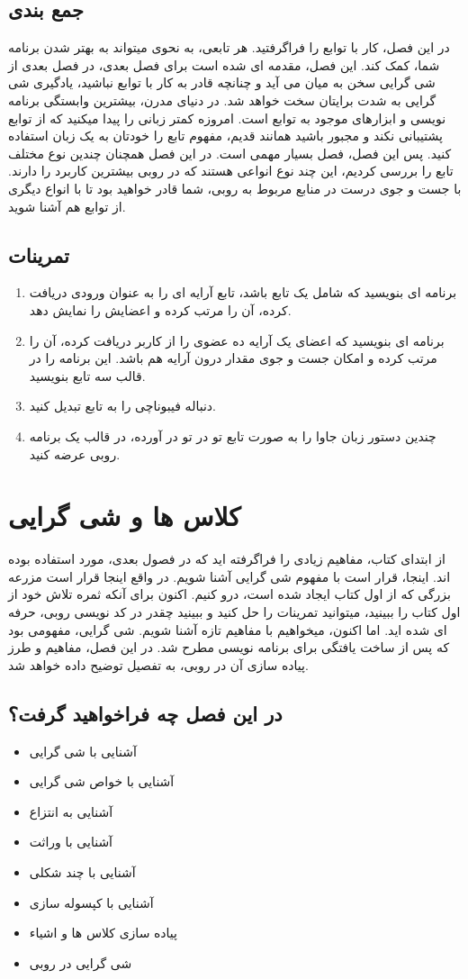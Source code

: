 \documentclass[11pt]{article}
\begin{document}
\subsection{جمع بندی}
در این فصل، کار با توابع را فراگرفتید. هر تابعی، به نحوی میتواند به بهتر شدن برنامه شما، کمک کند. این فصل، مقدمه ای شده است برای فصل بعدی، در فصل بعدی از شی گرایی سخن به میان می آید و چنانچه قادر به کار با توابع نباشید، یادگیری شی گرایی به شدت برایتان سخت خواهد شد. در دنیای مدرن، بیشترین وابستگی برنامه نویسی و ابزارهای موجود به توابع است. امروزه کمتر زبانی را پیدا میکنید که از توابع پشتیبانی نکند و مجبور باشید همانند قدیم، مفهوم تابع را خودتان به یک زبان استفاده کنید. پس این فصل، فصل بسیار مهمی است. در این فصل همچنان چندین نوع مختلف تابع را بررسی کردیم، این چند نوع انواعی هستند که در روبی بیشترین کاربرد را دارند. با جست و جوی درست در منابع مربوط به روبی، شما قادر خواهید بود تا با انواع دیگری از توابع هم آشنا شوید. 
\subsection{تمرینات}
\begin{enumerate}
\item برنامه ای بنویسید که شامل یک تابع باشد، تابع آرایه ای را به عنوان ورودی دریافت کرده، آن را مرتب کرده و اعضایش را نمایش دهد. 
\item برنامه ای بنویسید که اعضای یک آرایه ده عضوی را از کاربر دریافت کرده، آن را مرتب کرده و امکان جست و جوی مقدار درون آرایه هم باشد. این برنامه را در قالب سه تابع بنویسید. 
\item دنباله فیبوناچی را به تابع تبدیل کنید. 
\item چندین دستور زبان جاوا را به صورت تابع تو در تو در آورده، در قالب یک برنامه روبی عرضه کنید. 
\end{enumerate}
\newpage{}
\section{کلاس ها و شی گرایی}
از ابتدای کتاب، مفاهیم زیادی را فراگرفته اید که در فصول بعدی، مورد استفاده بوده اند. اینجا، قرار است با مفهوم شی گرایی آشنا شویم. در واقع اینجا قرار است مزرعه بزرگی که از اول کتاب ایجاد شده است، درو کنیم. اکنون برای آنکه ثمره تلاش خود از اول کتاب را ببینید، میتوانید تمرینات را حل کنید و ببینید چقدر در کد نویسی روبی، حرفه ای شده اید. اما اکنون، میخواهیم با مفاهیم تازه آشنا شویم. شی گرایی، مفهومی بود که پس از ساخت یافتگی برای برنامه نویسی مطرح شد. در این فصل، مفاهیم و طرز پیاده سازی آن در روبی، به تفصیل توضیح داده خواهد شد. 
\subsection{در این فصل چه فراخواهید گرفت؟}
\begin{itemize}
\item آشنایی با شی گرایی
\item آشنایی با خواص شی گرایی
\item آشنایی به انتزاع
\item آشنایی با وراثت
\item آشنایی با چند شکلی
\item آشنایی با کپسوله سازی
\item پیاده سازی کلاس ها و اشیاء
\item شی گرایی در روبی
\end{itemize}
\end{document}
